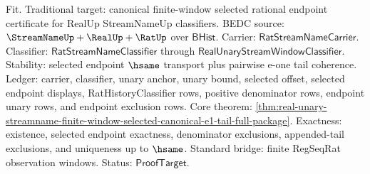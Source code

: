 Fit. Traditional target: canonical finite-window selected rational endpoint
certificate for RealUp StreamNameUp classifiers. BEDC source:
$\StreamNameUp+\RealUp+\RatUp$ over $\mathsf{BHist}$. Carrier:
$\mathsf{RatStreamNameCarrier}$. Classifier:
$\mathsf{RatStreamNameClassifier}$ through
$\mathsf{RealUnaryStreamWindowClassifier}$. Stability: selected endpoint
$\hsame$ transport plus pairwise e-one tail coherence. Ledger: carrier,
classifier, unary anchor, unary bound, selected offset, selected endpoint
displays, RatHistoryClassifier rows, positive denominator rows, endpoint
unary rows, and endpoint exclusion rows. Core theorem:
\autoref{thm:real-unary-streamname-finite-window-selected-canonical-e1-tail-full-package}.
Exactness: existence, selected endpoint exactness, denominator exclusions,
appended-tail exclusions, and uniqueness up to $\hsame$. Standard bridge: finite
RegSeqRat observation windows. Status: $\mathsf{ProofTarget}$.

